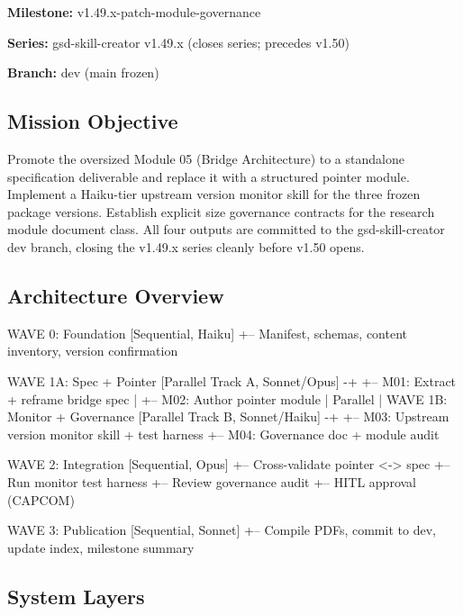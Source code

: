 \documentclass[11pt,letterpaper]{article}
\newcommand{\metafield}[2]{\textbf{\sffamily #1} #2\par}
\begin{document}
\metafield{Milestone:}{v1.49.x-patch-module-governance}
\metafield{Series:}{gsd-skill-creator v1.49.x (closes series; precedes v1.50)}
\metafield{Branch:}{dev (main frozen)}

\subsection{Mission Objective}

Promote the oversized Module 05 (Bridge Architecture) to a standalone specification deliverable and replace it with a structured pointer module. Implement a Haiku-tier upstream version monitor skill for the three frozen package versions. Establish explicit size governance contracts for the research module document class. All four outputs are committed to the gsd-skill-creator dev branch, closing the v1.49.x series cleanly before v1.50 opens.

\subsection{Architecture Overview}

\begin{asciibox}
WAVE 0: Foundation              [Sequential, Haiku]
  +-- Manifest, schemas, content inventory, version confirmation

WAVE 1A: Spec + Pointer         [Parallel Track A, Sonnet/Opus]  -+
  +-- M01: Extract + reframe bridge spec                           |
  +-- M02: Author pointer module                                   | Parallel
                                                                   |
WAVE 1B: Monitor + Governance   [Parallel Track B, Sonnet/Haiku] -+
  +-- M03: Upstream version monitor skill + test harness
  +-- M04: Governance doc + module audit

WAVE 2: Integration             [Sequential, Opus]
  +-- Cross-validate pointer <-> spec
  +-- Run monitor test harness
  +-- Review governance audit
  +-- HITL approval (CAPCOM)

WAVE 3: Publication             [Sequential, Sonnet]
  +-- Compile PDFs, commit to dev, update index, milestone summary
\end{asciibox}

\subsection{System Layers}
\end{document}
